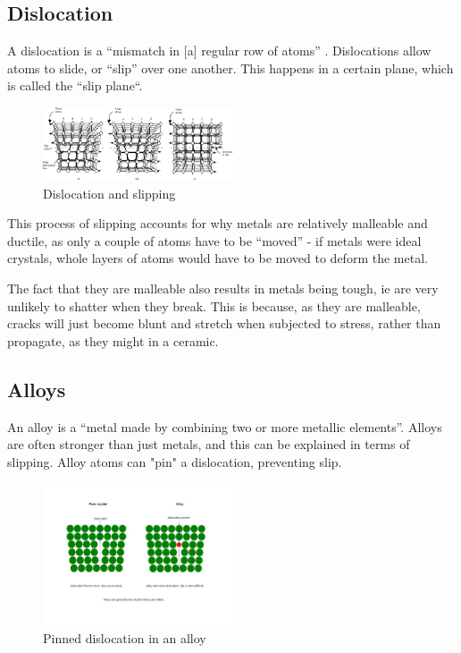 \documentclass{article}
\begin{document}
    \subsection{Dislocation}
    A dislocation is a ``mismatch in [a] regular row of atoms''
    \cite[p.~96]{OCRPhysics}. Dislocations allow atoms to slide, or ``slip''
    over one another. This happens in a certain plane, which is called the
    ``slip plane``.
    \begin{figure}[h]
        \includegraphics[width=0.5\textwidth]{dislocation}
        \centering
        \caption{Dislocation and slipping}
    \end{figure}
    This process of slipping accounts for why metals are relatively malleable
    and ductile, as only a couple of atoms have to be ``moved'' - if metals
    were ideal crystals, whole layers of atoms would have to be moved to deform
    the metal.
    
    The fact that they are malleable also results in metals being tough, ie are
    very unlikely to shatter when they break. This is because, as they are
    malleable, cracks will just become blunt and stretch when subjected to
    stress, rather than propagate, as they might in a ceramic.
    \subsection{Alloys}
    An alloy is a ``metal made by combining two or more metallic elements''.
    Alloys are often stronger than just metals, and this can be explained in
    terms of slipping. Alloy atoms can "pin" a dislocation, preventing slip.
    \begin{figure}[h]
        \includegraphics[width=0.5\textwidth]{alloy}
        \centering
        \caption{Pinned dislocation in an alloy}
    \end{figure}
\end{document}
